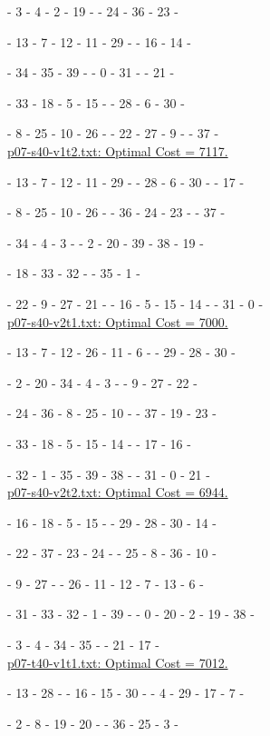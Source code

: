 \ta - 3 - 4 - 2 - 19 - \ta - 24 - 36 - 23 - \ta 

\tb - 13 - 7 - 12 - 11 - 29 - \tb - 16 - 14 - \tb 

\tb - 34 - 35 - 39 - \tb - 0 - 31 - \tb - 21 - \tb 

\te - 33 - 18 - 5 - 15 - \te - 28 - 6 - 30 - \te 

\te - 8 - 25 - 10 - 26 - \te - 22 - 27 - 9 - \te - 37 - \te 
\\

\underline{p07-s40-v1t2.txt: Optimal Cost = 7117.}

\ta - 13 - 7 - 12 - 11 - 29 - \ta - 28 - 6 - 30 - \ta - 17 - \ta 

\tb - 8 - 25 - 10 - 26 - \tb - 36 - 24 - 23 - \tb - 37 - \tb

\tb - 34 - 4 - 3 - \tb - 2 - 20 - 39 - 38 - 19 - \tb

\te - 18 - 33 - 32 - \te - 35 - 1 - \te 

\te - 22 - 9 - 27 - 21 - \te - 16 - 5 - 15 - 14 - \te - 31 - 0 - \te
\\

\underline{p07-s40-v2t1.txt: Optimal Cost = 7000.}

\ta - 13 - 7 - 12 - 26 - 11 - 6 - \ta - 29 - 28 - 30 - \ta 

\tb - 2 - 20 - 34 - 4 - 3 - \tb - 9 - 27 - 22 - \tb 

\tb - 24 - 36 - 8 - 25 - 10 - \tb - 37 - 19 - 23 - \tb 

\te - 33 - 18 - 5 - 15 - 14 - \te - 17 - 16 - \te 

\te - 32 - 1 - 35 - 39 - 38 - \te - 31 - 0 - 21 - \te 
\\

\underline{p07-s40-v2t2.txt: Optimal Cost = 6944.}

\ta - 16 - 18 - 5 - 15 - \ta - 29 - 28 - 30 - 14 - \ta 

\tc - 22 - 37 - 23 - 24 - \tc - 25 - 8 - 36 - 10 - \tc 

\tc - 9 - 27 - \tc - 26 - 11 - 12 - 7 - 13 - 6 - \tc

\te - 31 - 33 - 32 - 1 - 39 - \te - 0 - 20 - 2 - 19 - 38 - \te 

\te - 3 - 4 - 34 - 35 - \te - 21 - 17 - \te 
\\

\underline{p07-t40-v1t1.txt: Optimal Cost =  7012.}

\ta - 13 - 28 - \ta - 16 - 15 - 30 - \ta - 4 - 29 - 17 - 7 - \ta

\tb - 2 - 8 - 19 - 20 - \tb - 36 - 25 - 3 - \tb

